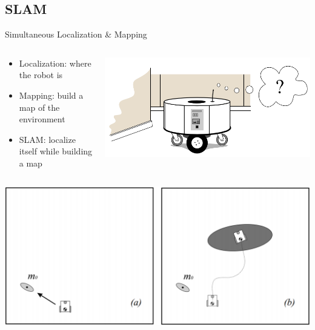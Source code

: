 \documentclass[serif,aspectratio=169]{beamer}
\begin{document}
    \subsection{SLAM}
    \begin{frame}{Simultaneous Localization \& Mapping}
        \begin{columns}[c]
            \begin{column}{.5\textwidth}
                \begin{itemize}
                    \item{Localization: where the robot is}
                    \item{Mapping: build a map of the environment}
                    \item{SLAM: localize itself while building a map}
                \end{itemize}
            \end{column}
            \begin{column}{.5\textwidth}
                \includegraphics[width=\linewidth]{Images/fig27-where-am-i.png}
            \end{column}
        \end{columns}
    \end{frame}
    \begin{frame}
        \centering
        \includegraphics[width=0.9\linewidth]{Images/fig26-slam-a-b.png}
    \end{frame}
\end{document}
